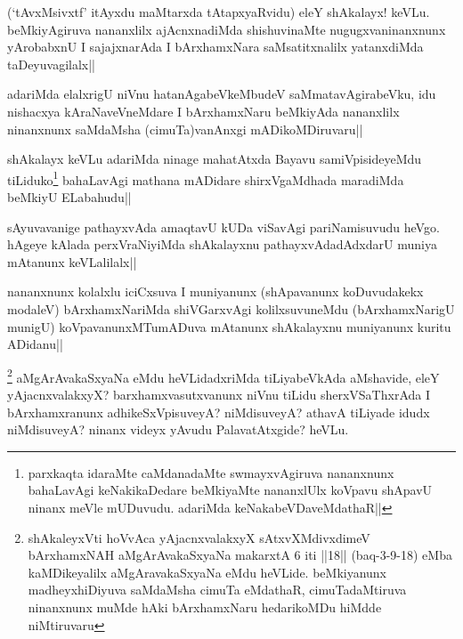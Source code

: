 \begin{artha}
(`tAvxMsivxtf' itAyxdu maMtarxda tAtapxyaRvidu) eleY shAkalayx! keVLu. beMkiyAgiruva nananxlilx ajAcnxnadiMda shishuvinaMte nugugxvaninanxnunx yArobabxnU I sajajxnarAda I bArxhamxNara saMsatitxnalilx yatanxdiMda taDeyuvagilalx||
\end{artha}

\begin{artha}
adariMda elalxrigU niVnu hatanAgabeVkeMbudeV saMmatavAgirabeVku, idu nishacxya kAraNaveVneMdare I bArxhamxNaru beMkiyAda nananxlilx ninanxnunx saMdaMsha (cimuTa)vanAnxgi mADikoMDiruvaru||
\end{artha}

\begin{artha}
shAkalayx keVLu adariMda ninage mahatAtxda Bayavu samiVpisideyeMdu tiLiduko\footnote[1]{parxkaqta idaraMte caMdanadaMte swmayxvAgiruva nananxnunx bahaLavAgi keNakikaDedare beMkiyaMte nananxlUlx koVpavu shApavU ninanx meVle mUDuvudu. adariMda keNakabeVDaveMdathaR||} bahaLavAgi mathana mADidare shirxVgaMdhada maradiMda beMkiyU ELabahudu||
\end{artha}

\begin{artha}%
sAyuvavanige pathayxvAda amaqtavU kUDa viSavAgi pariNamisuvudu heVgo. hAgeye kAlada perxVraNiyiMda shAkalayxnu pathayxvAdadAdxdarU muniya mAtanunx keVLalilalx||
\end{artha}


\begin{artha}
nananxnunx kolalxlu iciCxsuva I muniyanunx (shApavanunx koDuvudakekx modaleV) bArxhamxNariMda shiVGarxvAgi kolilxsuvuneMdu (bArxhamxNarigU munigU) koVpavanunxMTumADuva mAtanunx shAkalayxnu muniyanunx kuritu ADidanu||
\end{artha}


\begin{artha}
\footnote[1]{shAkaleyxVti hoVvAca yAjacnxvalakxyX sAtxvXMdivxdimeV bArxhamxNAH aMgArAvakaSxyaNa makarxtA 6 iti ||18|| (baq-3-9-18) eMba kaMDikeyalilx aMgAravakaSxyaNa eMdu heVLide. beMkiyanunx madheyxhiDiyuva saMdaMsha cimuTa eMdathaR, cimuTadaMtiruva ninanxnunx muMde hAki bArxhamxNaru hedarikoMDu hiMdde niMtiruvaru} aMgArAvakaSxyaNa eMdu heVLidadxriMda tiLiyabeVkAda aMshavide, eleY yAjacnxvalakxyX? barxhamxvasutxvanunx niVnu tiLidu sherxVSaThxrAda I bArxhamxranunx adhikeSxVpisuveyA? niMdisuveyA? athavA tiLiyade idudx niMdisuveyA? ninanx videyx yAvudu PalavatAtxgide? heVLu.
\end{artha}


